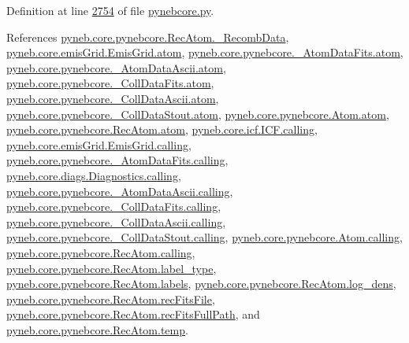 Definition at line \hyperlink{pynebcore_8py_source_l02754}{2754} of file \hyperlink{pynebcore_8py_source}{pynebcore.\-py}.



References \hyperlink{pynebcore_8py_source_l02731}{pyneb.\-core.\-pynebcore.\-Rec\-Atom.\-\_\-\-Recomb\-Data}, \hyperlink{emis_grid_8py_source_l00051}{pyneb.\-core.\-emis\-Grid.\-Emis\-Grid.\-atom}, \hyperlink{pynebcore_8py_source_l00089}{pyneb.\-core.\-pynebcore.\-\_\-\-Atom\-Data\-Fits.\-atom}, \hyperlink{pynebcore_8py_source_l00310}{pyneb.\-core.\-pynebcore.\-\_\-\-Atom\-Data\-Ascii.\-atom}, \hyperlink{pynebcore_8py_source_l00576}{pyneb.\-core.\-pynebcore.\-\_\-\-Coll\-Data\-Fits.\-atom}, \hyperlink{pynebcore_8py_source_l00926}{pyneb.\-core.\-pynebcore.\-\_\-\-Coll\-Data\-Ascii.\-atom}, \hyperlink{pynebcore_8py_source_l01162}{pyneb.\-core.\-pynebcore.\-\_\-\-Coll\-Data\-Stout.\-atom}, \hyperlink{pynebcore_8py_source_l01218}{pyneb.\-core.\-pynebcore.\-Atom.\-atom}, \hyperlink{pynebcore_8py_source_l02635}{pyneb.\-core.\-pynebcore.\-Rec\-Atom.\-atom}, \hyperlink{icf_8py_source_l00016}{pyneb.\-core.\-icf.\-I\-C\-F.\-calling}, \hyperlink{emis_grid_8py_source_l00044}{pyneb.\-core.\-emis\-Grid.\-Emis\-Grid.\-calling}, \hyperlink{pynebcore_8py_source_l00097}{pyneb.\-core.\-pynebcore.\-\_\-\-Atom\-Data\-Fits.\-calling}, \hyperlink{diags_8py_source_l00169}{pyneb.\-core.\-diags.\-Diagnostics.\-calling}, \hyperlink{pynebcore_8py_source_l00318}{pyneb.\-core.\-pynebcore.\-\_\-\-Atom\-Data\-Ascii.\-calling}, \hyperlink{pynebcore_8py_source_l00585}{pyneb.\-core.\-pynebcore.\-\_\-\-Coll\-Data\-Fits.\-calling}, \hyperlink{pynebcore_8py_source_l00936}{pyneb.\-core.\-pynebcore.\-\_\-\-Coll\-Data\-Ascii.\-calling}, \hyperlink{pynebcore_8py_source_l01156}{pyneb.\-core.\-pynebcore.\-\_\-\-Coll\-Data\-Stout.\-calling}, \hyperlink{pynebcore_8py_source_l01229}{pyneb.\-core.\-pynebcore.\-Atom.\-calling}, \hyperlink{pynebcore_8py_source_l02643}{pyneb.\-core.\-pynebcore.\-Rec\-Atom.\-calling}, \hyperlink{pynebcore_8py_source_l02749}{pyneb.\-core.\-pynebcore.\-Rec\-Atom.\-label\-\_\-type}, \hyperlink{pynebcore_8py_source_l02746}{pyneb.\-core.\-pynebcore.\-Rec\-Atom.\-labels}, \hyperlink{pynebcore_8py_source_l02743}{pyneb.\-core.\-pynebcore.\-Rec\-Atom.\-log\-\_\-dens}, \hyperlink{pynebcore_8py_source_l02646}{pyneb.\-core.\-pynebcore.\-Rec\-Atom.\-rec\-Fits\-File}, \hyperlink{pynebcore_8py_source_l02726}{pyneb.\-core.\-pynebcore.\-Rec\-Atom.\-rec\-Fits\-Full\-Path}, and \hyperlink{pynebcore_8py_source_l02739}{pyneb.\-core.\-pynebcore.\-Rec\-Atom.\-temp}.


